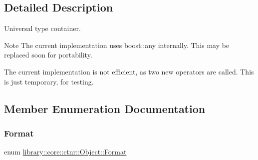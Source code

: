 \subsection{Detailed Description}
Universal type container. 

\begin{DoxyNote}{Note}
The current implementation uses boost\+::any internally. This may be replaced soon for portability. 

The current implementation is not efficient, as two new operators are called. This is just temporary, for testing. 
\end{DoxyNote}


\subsection{Member Enumeration Documentation}
\mbox{\label{classlibrary_1_1core_1_1ctnr_1_1_object_a7bf8961c4ef65f691aa2993ec405c647}} 
\subsubsection{\texorpdfstring{Format}{Format}}
{\footnotesize\ttfamily enum \hyperlink{classlibrary_1_1core_1_1ctnr_1_1_object_a7bf8961c4ef65f691aa2993ec405c647}{library\+::core\+::ctnr\+::\+Object\+::\+Format}\hspace{0.3cm}{\ttfamily [strong]}}

